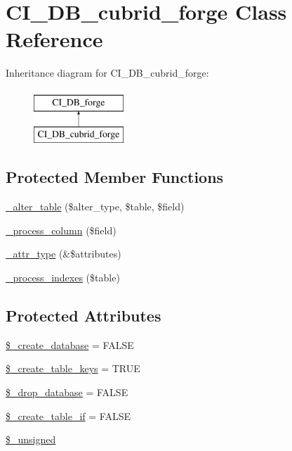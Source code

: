 \hypertarget{class_c_i___d_b__cubrid__forge}{}\section{C\+I\+\_\+\+D\+B\+\_\+cubrid\+\_\+forge Class Reference}
\label{class_c_i___d_b__cubrid__forge}
Inheritance diagram for C\+I\+\_\+\+D\+B\+\_\+cubrid\+\_\+forge\+:\begin{figure}[H]
\begin{center}
\leavevmode
\includegraphics[height=2.000000cm]{class_c_i___d_b__cubrid__forge}
\end{center}
\end{figure}
\subsection*{Protected Member Functions}
\begin{DoxyCompactItemize}
\item 
\hyperlink{class_c_i___d_b__cubrid__forge_a41c6cae02f2fda8b429ad0afb9509426}{\+\_\+alter\+\_\+table} (\$alter\+\_\+type, \$table, \$field)
\item 
\hyperlink{class_c_i___d_b__cubrid__forge_a8f38f1c5b5dddecca4befbe393f3f299}{\+\_\+process\+\_\+column} (\$field)
\item 
\hyperlink{class_c_i___d_b__cubrid__forge_a8553be952084c6f7cdfff370a1d14f6b}{\+\_\+attr\+\_\+type} (\&\$attributes)
\item 
\hyperlink{class_c_i___d_b__cubrid__forge_ae0bdb4ea3418590d1894c5b621b5ca50}{\+\_\+process\+\_\+indexes} (\$table)
\end{DoxyCompactItemize}
\subsection*{Protected Attributes}
\begin{DoxyCompactItemize}
\item 
\hyperlink{class_c_i___d_b__cubrid__forge_acd23c9a8735806155f1a5d0a87c151f2}{\$\+\_\+create\+\_\+database} = F\+A\+L\+S\+E
\item 
\hyperlink{class_c_i___d_b__cubrid__forge_a73e07acdd35c948ad353903c2827af6e}{\$\+\_\+create\+\_\+table\+\_\+keys} = T\+R\+U\+E
\item 
\hyperlink{class_c_i___d_b__cubrid__forge_a8305b12fc17f6f87778260ebdff287b4}{\$\+\_\+drop\+\_\+database} = F\+A\+L\+S\+E
\item 
\hyperlink{class_c_i___d_b__cubrid__forge_a2f6484fcb8d1dc3eef67a637227cd583}{\$\+\_\+create\+\_\+table\+\_\+if} = F\+A\+L\+S\+E
\item 
\hyperlink{class_c_i___d_b__cubrid__forge_aae977ae6d61fa183f0b25422b6ddc31c}{\$\+\_\+unsigned}
\end{DoxyCompactItemize}
